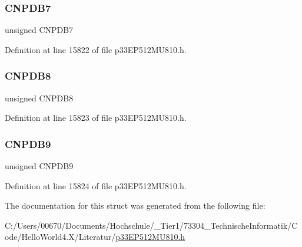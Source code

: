 \subsubsection{\texorpdfstring{C\+N\+P\+D\+B7}{CNPDB7}}
{\footnotesize\ttfamily unsigned C\+N\+P\+D\+B7}



Definition at line 15822 of file p33\+E\+P512\+M\+U810.\+h.

\mbox{\label{structtag_c_n_p_d_b_b_i_t_s_a7f7f1546493f6283c1a61ea6dc448f78}} 
\subsubsection{\texorpdfstring{C\+N\+P\+D\+B8}{CNPDB8}}
{\footnotesize\ttfamily unsigned C\+N\+P\+D\+B8}



Definition at line 15823 of file p33\+E\+P512\+M\+U810.\+h.

\mbox{\label{structtag_c_n_p_d_b_b_i_t_s_a8a6cf602892fdbefb1da0f66da08119e}} 
\subsubsection{\texorpdfstring{C\+N\+P\+D\+B9}{CNPDB9}}
{\footnotesize\ttfamily unsigned C\+N\+P\+D\+B9}



Definition at line 15824 of file p33\+E\+P512\+M\+U810.\+h.



The documentation for this struct was generated from the following file\+:\begin{DoxyCompactItemize}
\item 
C\+:/\+Users/00670/\+Documents/\+Hochschule/\+\_\+\+Tier1/73304\+\_\+\+Technische\+Informatik/\+Code/\+Hello\+World4.\+X/\+Literatur/\hyperlink{p33_e_p512_m_u810_8h}{p33\+E\+P512\+M\+U810.\+h}\end{DoxyCompactItemize}
